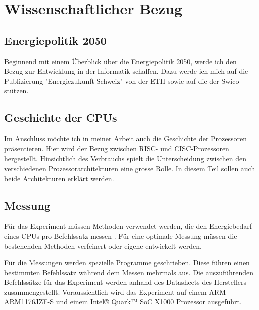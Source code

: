 \section{Wissenschaftlicher Bezug}

\subsection{Energiepolitik 2050}
Beginnend mit einem Überblick über die Energiepolitik 2050, werde ich den Bezug zur Entwicklung in der
Informatik schaffen. Dazu werde ich mich auf die Publizierung
"Energiezukunft Schweiz"\cite{eth_energiezukunft_schweiz} von der ETH sowie auf die\cite{swico_datenblatt}
der Swico stützen.

\subsection{Geschichte der CPUs}
Im Anschluss möchte ich in meiner Arbeit auch die Geschichte der Prozessoren präsentieren. Hier wird der Bezug
zwischen RISC- und CISC-Prozessoren hergestellt. Hinsichtlich des Verbrauchs spielt die Unterscheidung zwischen den verschiedenen 
Prozessorarchitekturen eine grosse Rolle\cite{stanford_risc_cisc}. In diesem Teil sollen auch beide Architekturen erklärt werden.


\subsection{Messung}
Für das Experiment müssen Methoden verwendet werden, die den Energiebedarf eines CPUs pro Befehlssatz messen
\cite{measuring_power_temperature, analysis_circuits, intel_epi}. Für eine optimale Messung müssen die bestehenden Methoden
verfeinert oder eigene entwickelt werden.
\par
Für die Messungen werden spezielle Programme geschrieben. Diese führen einen bestimmten Befehlssatz während dem Messen mehrmals aus.
Die auszuführenden Befehlssätze für das Experiment werden anhand des Datasheets des Herstellers zusammengestellt.
Voraussichtlich wird das Experiment auf einem ARM ARM1176JZF-S\cite{arm_datasheet} und einem Intel® Quark™ SoC
X1000 \cite{intel_datasheet} Prozessor ausgeführt.


